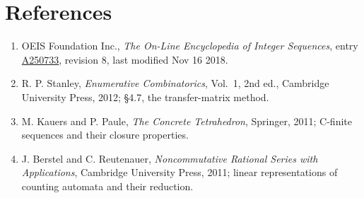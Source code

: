 \documentclass[11pt]{article}
\theoremstyle{definition}
\begin{document}
\section{References}

\begin{enumerate}

\item OEIS Foundation Inc., \emph{The On-Line Encyclopedia of Integer Sequences}, entry \href{https://oeis.org/A250733}{A250733}, revision 8, last modified Nov 16 2018.

\item R. P. Stanley, \emph{Enumerative Combinatorics}, Vol.~1, 2nd ed., Cambridge University Press, 2012; \S4.7, the transfer-matrix method.

\item M. Kauers and P. Paule, \emph{The Concrete Tetrahedron}, Springer, 2011; C-finite sequences and their closure properties.

\item J. Berstel and C. Reutenauer, \emph{Noncommutative Rational Series with Applications}, Cambridge University Press, 2011; linear representations of counting automata and their reduction.

\end{enumerate}
\end{document}

